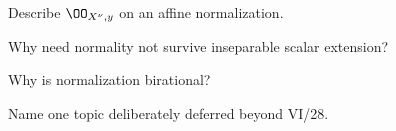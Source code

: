 \begin{exercise}\label{exer:vi28-23}
Describe $\OO_{X^\nu,y}$ on an affine normalization.
\end{exercise}

\begin{exercise}\label{exer:vi28-24}
Why need normality not survive inseparable scalar extension?
\end{exercise}

\begin{exercise}[VI.28.E25: Birationality]\label{exer:vi28-25}
Why is normalization birational?
\end{exercise}

\begin{exercise}[VI.28.E26: Boundary]\label{exer:vi28-26}
Name one topic deliberately deferred beyond VI/28.
\end{exercise}
